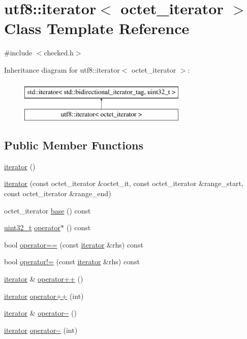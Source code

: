 \hypertarget{classutf8_1_1iterator}{}\section{utf8\+:\+:iterator$<$ octet\+\_\+iterator $>$ Class Template Reference}
\label{classutf8_1_1iterator}


{\ttfamily \#include $<$checked.\+h$>$}

Inheritance diagram for utf8\+:\+:iterator$<$ octet\+\_\+iterator $>$\+:\begin{figure}[H]
\begin{center}
\leavevmode
\includegraphics[height=2.000000cm]{classutf8_1_1iterator}
\end{center}
\end{figure}
\subsection*{Public Member Functions}
\begin{DoxyCompactItemize}
\item 
\hyperlink{classutf8_1_1iterator_a507000943ac3fdfe59331dac3c35c6bd}{iterator} ()
\item 
\hyperlink{classutf8_1_1iterator_a85a9cb70e9e77d2d04eba61612b5ef13}{iterator} (const octet\+\_\+iterator \&octet\+\_\+it, const octet\+\_\+iterator \&range\+\_\+start, const octet\+\_\+iterator \&range\+\_\+end)
\item 
octet\+\_\+iterator \hyperlink{classutf8_1_1iterator_aec700ec9689fe88ebe9a7fe1feca8d2d}{base} () const 
\item 
\hyperlink{namespaceutf8_a846259d2f173d524282583fc9d825b00}{uint32\+\_\+t} \hyperlink{classutf8_1_1iterator_abbe7cf79cc5b78a375d80b0dba39fa0c}{operator$\ast$} () const 
\item 
bool \hyperlink{classutf8_1_1iterator_a0527930d64be7835f881bf649a317cfb}{operator==} (const \hyperlink{classutf8_1_1iterator}{iterator} \&rhs) const 
\item 
bool \hyperlink{classutf8_1_1iterator_a6be99d96bf62e7e0d9f1bdc1841efb3c}{operator!=} (const \hyperlink{classutf8_1_1iterator}{iterator} \&rhs) const 
\item 
\hyperlink{classutf8_1_1iterator}{iterator} \& \hyperlink{classutf8_1_1iterator_a93e9ac16a560fab545a05efb6b0a3add}{operator++} ()
\item 
\hyperlink{classutf8_1_1iterator}{iterator} \hyperlink{classutf8_1_1iterator_aa21c39e32e3bf53c08d8ee5cde280671}{operator++} (int)
\item 
\hyperlink{classutf8_1_1iterator}{iterator} \& \hyperlink{classutf8_1_1iterator_a7781099a85323b5a3ff4dc1015ca5af0}{operator-\/-\/} ()
\item 
\hyperlink{classutf8_1_1iterator}{iterator} \hyperlink{classutf8_1_1iterator_afc228985ba672a6b6966ea0a705a4755}{operator-\/-\/} (int)
\end{DoxyCompactItemize}


